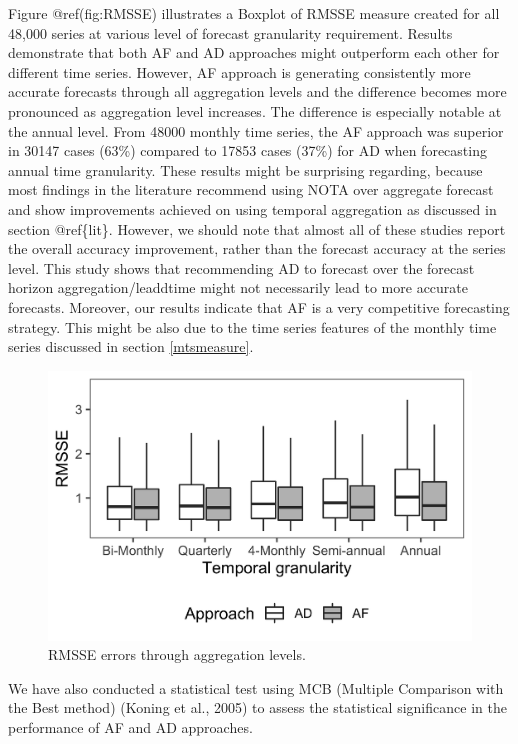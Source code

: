 \documentclass[]{elsarticle} %
\begin{document}
Figure @ref(fig:RMSSE) illustrates a Boxplot of RMSSE measure created
for all 48,000 series at various level of forecast granularity
requirement. Results demonstrate that both AF and AD approaches might
outperform each other for different time series. However, AF approach is
generating consistently more accurate forecasts through all aggregation
levels and the difference becomes more pronounced as aggregation level
increases. The difference is especially notable at the annual level.
From 48000 monthly time series, the AF approach was superior in 30147
cases (63\%) compared to 17853 cases (37\%) for AD when forecasting
annual time granularity. These results might be surprising regarding,
because most findings in the literature recommend using NOTA over
aggregate forecast and show improvements achieved on using temporal
aggregation as discussed in section @ref\{lit\}. However, we should note
that almost all of these studies report the overall accuracy
improvement, rather than the forecast accuracy at the series level. This
study shows that recommending AD to forecast over the forecast horizon
aggregation/leaddtime might not necessarily lead to more accurate
forecasts. Moreover, our results indicate that AF is a very competitive
forecasting strategy. This might be also due to the time series features
of the monthly time series discussed in section \ref{mtsmeasure}.

\begin{figure}[H]

{\centering \includegraphics[width=0.7\linewidth]{img/300dpi/box_plot_rmsse} 

}

\caption{RMSSE errors through aggregation levels.}\label{fig:RMSSE}
\end{figure}

We have also conducted a statistical test using MCB (Multiple Comparison
with the Best method) (Koning et al., 2005) to assess the statistical
significance in the performance of AF and AD approaches.
\end{document}
